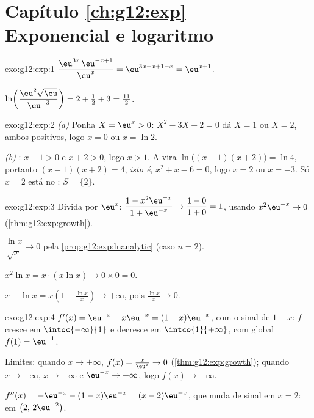 \section*{Capítulo \ref{ch:g12:exp} --- Exponencial e logaritmo}

\begin{solution}{exo:g12:exp:1}
$\dfrac{\eu^{3x}\,\eu^{-x+1}}{\eu^{x}} = \eu^{3x - x + 1 - x} = \eu^{x+1}$.

$\ln\!\left(\dfrac{\eu^2\sqrt{\eu}}{\eu^{-3}}\right)
= 2 + \tfrac12 + 3 = \tfrac{11}{2}$.
\end{solution}

\begin{solution}{exo:g12:exp:2}
\emph{(a)} Ponha $X = \eu^x > 0$: $X^2 - 3X + 2 = 0$ dá $X = 1$ ou
$X = 2$, ambos positivos, logo $x = 0$ ou $x = \ln 2$.

\emph{(b)} : $x - 1 > 0$ e $x + 2 > 0$, logo $x > 1$. A  vira
$\ln\bigl((x-1)(x+2)\bigr) = \ln 4$, portanto $(x-1)(x+2) = 4$,
\emph{isto é}, $x^2 + x - 6 = 0$, logo $x = 2$ ou $x = -3$. Só $x = 2$
está no : $S = \{2\}$.
\end{solution}

\begin{solution}{exo:g12:exp:3}
Divida por $\eu^x$:
$\dfrac{1 - x^2\eu^{-x}}{1 + \eu^{-x}} \to \dfrac{1-0}{1+0} = 1$, usando
$x^2 \eu^{-x} \to 0$ (\cref{thm:g12:exp:growth}).

$\dfrac{\ln x}{\sqrt x} \to 0$ pela \cref{prop:g12:exp:lnanalytic} (caso
$n = 2$).

$x^2 \ln x = x \cdot (x \ln x) \to 0 \times 0 = 0$.

$x - \ln x = x\left(1 - \frac{\ln x}{x}\right) \to +\infty$, pois
$\frac{\ln x}{x} \to 0$.
\end{solution}

\begin{solution}{exo:g12:exp:4}
$f'(x) = \eu^{-x} - x\eu^{-x} = (1 - x)\eu^{-x}$, com o sinal de
$1 - x$: $f$ cresce em $\intoc{-\infty}{1}$ e decresce em
$\intco{1}{+\infty}$, com  global $f(1) = \eu^{-1}$.

Limites: quando $x \to +\infty$, $f(x) = \frac{x}{\eu^x} \to 0$
(\cref{thm:g12:exp:growth}); quando $x \to -\infty$, $x \to -\infty$ e
$\eu^{-x} \to +\infty$, logo $f(x) \to -\infty$.

$f''(x) = -\eu^{-x} - (1-x)\eu^{-x} = (x - 2)\eu^{-x}$, que muda de sinal
em $x = 2$:  em $\bigl(2,\, 2\eu^{-2}\bigr)$.
\end{solution}

